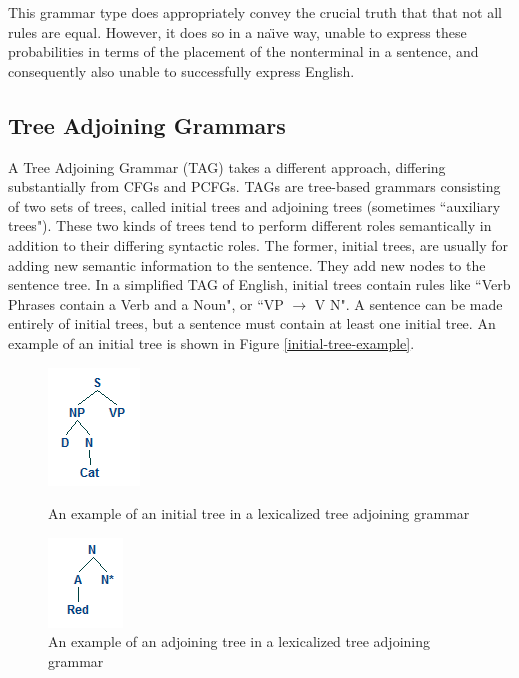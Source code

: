 This grammar type does appropriately convey the crucial truth that that not all rules are equal.
However, it does so in a  na\"{\i}ve way, unable to express these probabilities in terms of the placement
of the nonterminal in a sentence, and consequently also unable to successfully express English.

\subsection{Tree Adjoining Grammars}

A Tree Adjoining Grammar (TAG) takes a different approach, differing substantially from CFGs and PCFGs.
TAGs are tree-based grammars consisting of two sets of trees, called initial
trees and adjoining trees (sometimes ``auxiliary trees").  These two kinds of trees tend to perform
different roles semantically in addition to their differing syntactic roles.  The former,
initial trees, are usually for adding new semantic information to the sentence.  They
add new nodes to the sentence tree.  In a simplified TAG of English,
initial trees contain rules like ``Verb Phrases contain a Verb and a Noun", or ``VP $\rightarrow$ V N".
A sentence can be made entirely of initial trees, but a sentence must contain at least
one initial tree.  An example of an initial tree is shown in Figure \ref{initial-tree-example}.

\begin{figure}[ht]
\centering
\begin{minipage}[b]{0.45\linewidth}
\centering
\includegraphics{initial-example.png}
\caption{An example of an initial tree in a lexicalized tree adjoining grammar}
\label{initial-tree-example}
\end{minipage}
\quad
\begin{minipage}[b]{0.45\linewidth}
\centering
\includegraphics{adjoining-tree-example.png}
\caption{An example of an adjoining tree in a lexicalized tree adjoining grammar}
\label{adjoining-tree-example}
\end{minipage}
\end{figure}

